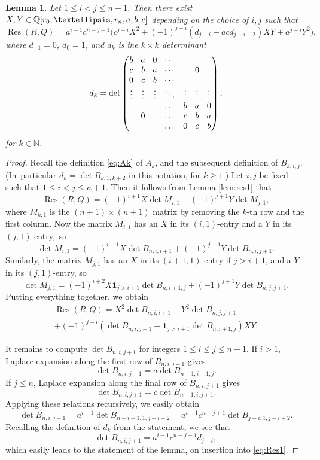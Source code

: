 \documentclass[11pt]{article}
\DeclareMathOperator{\Res}{Res}
\newcommand{\NN}{\mathbb{N}}
\newtheorem{lemma}[theorem]{Lemma}
\numberwithin{equation}{section}
\begin{document}
\begin{lemma}\label{lem:res2}
Let $1\leq i<j\leq n+1$.
Then there exist $X,Y\in\Q[r_0,\dots, r_n,a,b,c]$ depending on the choice of $i,j$ such that
\[
\Res(R,Q)
=a^{i-1}c^{n-j+1}\bigl(c^{j-i}X^2+(-1)^{j-i}(d_{j-i}-acd_{j-i-2})XY+a^{j-i}Y^2\bigr),
\]
where
$d_{-1}=0$, $d_0=1$, and $d_k$ is the $k\times k$ determinant
\[\arraycolsep4.5pt
d_k=\det
\begin{pmatrix}
b & a & 0& \cdots & & & \\
c & b& a& \cdots & & 0&\\
0 & c& b& \cdots & & & \\
\vdots & \vdots &\vdots & \ddots &\vdots &\vdots &\vdots \\
& & & \dots& b& a& 0\\
& 0 & &\dots& c& b& a\\
& & &\dots & 0& c& b
\end{pmatrix},
\]
for $k\in \NN$.
\end{lemma}

\begin{proof}
Recall the definition \eqref{eq:Ak} of $A_k$,
and the subsequent definition of $B_{k,i,j}$.
(In~particular $d_k=\det B_{k,1,k+2}$ in this notation, for $k\geq 1$.)
Let $i,j$ be fixed such that $1\leq i<j\leq n+1$. Then
it follows from Lemma \ref{lem:res1} that
\[
\Res(R,Q)=(-1)^{i+1}X\det M_{i,1}+(-1)^{j+1}Y\det M_{j,1},
\]
where $M_{k,1}$ is the $(n+1)\times(n+1)$ matrix by removing the $k$-th row and the first column.
Now the matrix $M_{i,1}$ has an $X$ in its $(i,1)$-entry and a $Y$ in its $(j,1)$-entry,~so
\[
\det M_{i,1}=(-1)^{i+1}X\det B_{n,i,i+1}+(-1)^{j+1}Y\det B_{n,i,j+1}.
\]
Similarly,
the matrix $M_{j,1}$ has an $X$ in its $(i+1,1)$-entry if $j>i+1$, and a $Y$ in its $(j,1)$-entry, so
\[
\det M_{j,1}=(-1)^{i+2}X\mathbf{1}_{j> i+1}\det B_{n,i+1,j}+(-1)^{j+1} Y\det B_{n,j,j+1}.
\]
Putting everything together, we obtain
\begin{multline}\label{eq:Res1}
\Res(R,Q)
=
X^2\det B_{n,i,i+1}
+Y^2 \det B_{n,j,j+1}\\
+(-1)^{j-i}\left(\det B_{n,i,j+1}-\mathbf{1}_{j> i+1}\det B_{n,i+1,j}\right)XY.
\end{multline}

It remains to compute $\det B_{n,i,j+1}$ for
integers $1\leq i\leq j\leq n+1$.
If $i>1$, Laplace expansion along the first row of $B_{n,i,j+1}$ gives
\[
\det B_{n,i,j+1}=a\det B_{n-1,i-1,j}.
\]
If $j\leq n$, Laplace expansion along the final row of $B_{n,i,j+1}$ gives
\[
\det B_{n,i,j+1}=c\det B_{n-1,i,j+1}.
\]
Applying these relations recursively, we easily obtain
\[
\det B_{n,i,j+1}
=a^{i-1}\det B_{n-i+1,1,j-i+2}
=a^{i-1}c^{n-j+1}
\det B_{j-i,1,j-i+2}.
\]
Recalling the definition of $d_k$ from the statement,
we see that
\[
\det B_{n,i,j+1}=a^{i-1}c^{n-j+1}d_{j-i},
\]
which easily leads to the statement of the lemma, on insertion into \eqref{eq:Res1}.
\end{proof}
\end{document}
